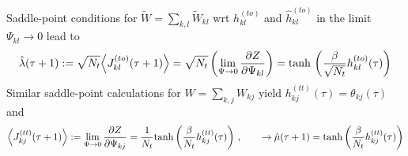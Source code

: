 \documentclass[%
 reprint,
superscriptaddress,
 amsmath,amssymb,
 prl,
]{revtex4-2}
\begin{document}
Saddle-point conditions for $\tilde{W}= \sum_{k,l} \tilde{W}_{kl}$ wrt $h_{kl}^{(to)}$ and $\hat{h}_{kl}^{(to)}$ in the limit $\Psi_{kl} \rightarrow 0$  lead to
\begin{equation}
  \hat{\lambda}(\tau+1)  := \sqrt{N_t}  \Big\langle J^{(to)}_{kl}(\tau+1) \Big\rangle = \sqrt{N_t} \left(\lim_{\Psi\rightarrow 0}  \frac{\partial Z}{\partial \Psi_{kl}}\right)  ={\rm tanh}\,\left(\frac{ \beta}{\sqrt{N_t}} h_{kl}^{(to)}(\tau)\right)  
\end{equation}
Similar saddle-point calculations for $W= \sum_{k,j} W_{kj}$  yield $ h_{kj}^{(tt)}(\tau) = \theta_{kj}(\tau)$ and 
\begin{equation}
   \Big \langle   J^{(tt)}_{kj}(\tau+1) \Big\rangle  :=\lim_{\Psi\rightarrow 0} \frac{\partial Z}{\partial \Psi_{kj}} = \frac{1}{N_t}{\rm tanh} \left(\frac{ \beta}{N_t} h_{kj}^{(tt)}(\tau)\right)\,,\qquad  \rightarrow \hat{\mu}(\tau+1) =  {\rm tanh} \left(\frac{ \beta}{N_t} h_{kj}^{(tt)}(\tau)\right)
\end{equation}
\end{document}
